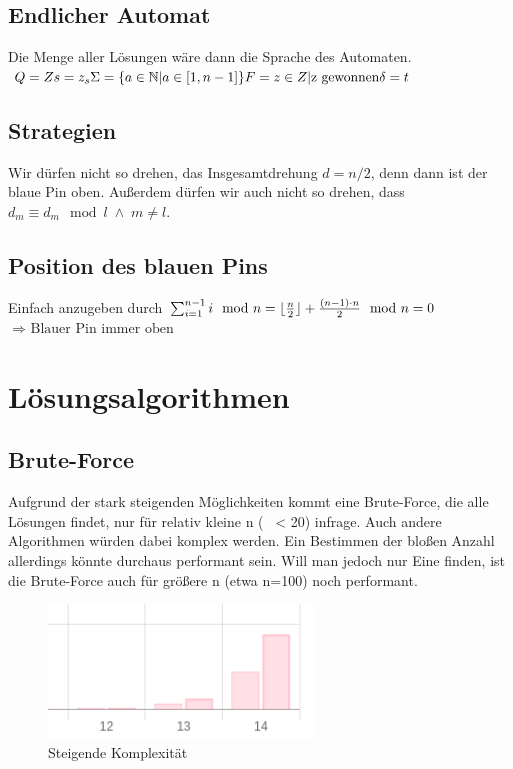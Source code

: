 \documentclass{article}
\begin{document}
\subsection{Endlicher Automat}
Die Menge aller Lösungen wäre dann die Sprache des Automaten.
$
Q = Z \\
s = z_s \\
\Sigma = \{a \in \mathbb{N} | a \in [1, n-1]\} \\
F = {z \in Z | \text{z gewonnen}} \\
\delta = t
$

\subsection{Strategien}

Wir dürfen nicht so drehen, das Insgesamtdrehung $d = n/2$, denn dann ist der blaue Pin oben.
Außerdem dürfen wir auch nicht so drehen, dass $d_m \equiv d_m \mod l \;\land\; m \neq l$.

\subsection{Position des blauen Pins}
Einfach anzugeben durch $\sum_{i=1}^{n-1} i \mod n = \lfloor\frac{n}{2}\rfloor + \frac{(n-1) \cdot n}{2} \mod n = 0\\$
$\Rightarrow \text{ Blauer Pin immer oben }$

\section{Lösungsalgorithmen}

\subsection{Brute-Force}
Aufgrund der stark steigenden Möglichkeiten kommt eine Brute-Force, die alle Lösungen findet, nur für relativ kleine n (~ < 20) infrage.
Auch andere Algorithmen würden dabei komplex werden. Ein Bestimmen der bloßen Anzahl allerdings könnte durchaus performant sein.
Will man jedoch nur Eine finden, ist die Brute-Force auch für größere n (etwa n=100) noch performant.

\begin{figure}
    \centering
    \includegraphics[width=200pt]{graph.png}
    \caption{Steigende Komplexität}
    \label{fig:graph}
\end{figure}
\end{document}

